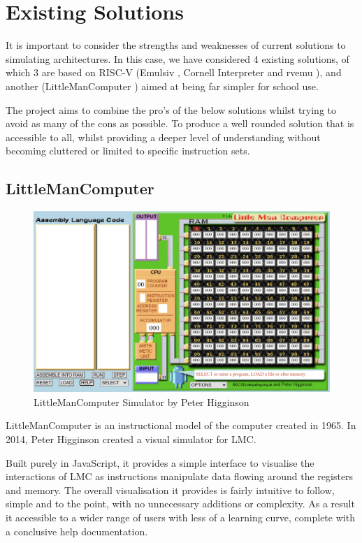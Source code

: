 \section{Existing Solutions}

It is important to consider the strengths and weaknesses of current solutions to simulating architectures. In this case, we have considered 4 existing solutions, of which 3 are based on RISC-V (Emulsiv \cite{savaton_2023_eseotechemulsiv}, Cornell Interpreter \cite{cornelluniversity_riscv} and rvemu \cite{doi_2021_d0iasmrvemu}), and another (LittleManComputer \cite{higginson_2014_little}) aimed at being far simpler for school use.

The project aims to combine the pro's of the below solutions whilst trying to avoid as many of the cons as possible. To produce a well rounded solution that is accessible to all, whilst providing a deeper level of understanding without becoming cluttered or limited to specific instruction sets.

\subsection{LittleManComputer}\label{sec:lmc}
\begin{figure}[H]
    \centering
    \includegraphics[width=0.75\linewidth]{dissertation/DATA/LMC.jpg}
    \caption{LittleManComputer Simulator by Peter Higginson}
    \label{fig:lmc}
\end{figure}
LittleManComputer \cite{higginson_2014_little} is an instructional model of the computer created in 1965. In 2014, Peter Higginson created a visual simulator \cite{higginson_2014_little} for LMC.

Built purely in JavaScript, it provides a simple interface to visualise the interactions of LMC as instructions manipulate data flowing around the registers and memory. The overall visualisation it provides is fairly intuitive to follow, simple and to the point, with no unnecessary additions or complexity. As a result it accessible to a wider range of users with less of a learning curve, complete with a conclusive help documentation.


